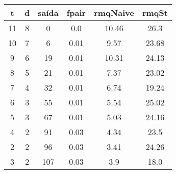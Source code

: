 \begin{tabular}{|c|c|c|c|c|c|}
\hline
\textbf{t} & \textbf{d} & \textbf{saída} & \textbf{fpair} & \textbf{rmqNaive} & \textbf{rmqSt}\\
\hline
11 & 8 & 0 & 0.0 & 10.46 & 26.3\\
\hline
10 & 7 & 6 & 0.01 & 9.57 & 23.68\\
\hline
9 & 6 & 19 & 0.01 & 10.31 & 24.13\\
\hline
8 & 5 & 21 & 0.01 & 7.37 & 23.02\\
\hline
7 & 4 & 32 & 0.01 & 6.74 & 19.24\\
\hline
6 & 3 & 55 & 0.01 & 5.54 & 25.02\\
\hline
5 & 3 & 67 & 0.01 & 5.03 & 24.16\\
\hline
4 & 2 & 91 & 0.03 & 4.34 & 23.5\\
\hline
2 & 2 & 96 & 0.03 & 3.41 & 24.26\\
\hline
3 & 2 & 107 & 0.03 & 3.9 & 18.0\\
\hline
\end{tabular}
